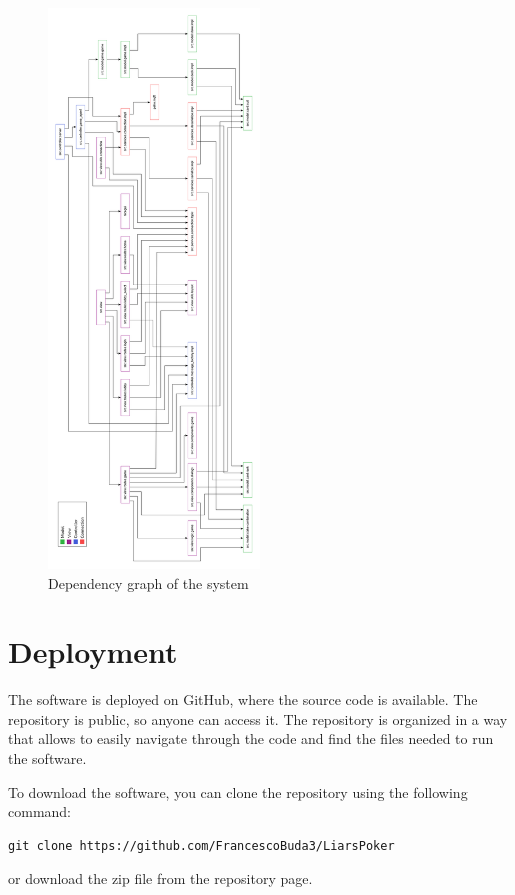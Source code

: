 \documentclass{scrartcl}
\begin{document}
\begin{figure}
      \centering
      \includegraphics[width=0.5\textwidth]{figures/dependencyGraph.png}
      \caption{Dependency graph of the system}
      \label{fig:dependencyGraph}
\end{figure}

\newpage
\section{Deployment}\label{deployment}

The software is deployed on GitHub, where the source code is available. The repository is public, so 
anyone can access it. The repository is organized in a way that allows to easily navigate through the 
code and find the files needed to run the software.

To download the software, you can clone the repository using the following command:
\begin{verbatim}
git clone https://github.com/FrancescoBuda3/LiarsPoker
\end{verbatim}
or download the zip file from the repository page. 
\end{document}
